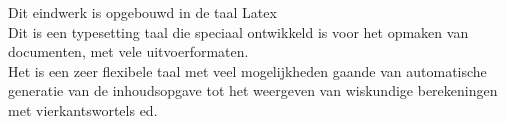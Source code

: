 Dit eindwerk is opgebouwd in de taal Latex\\
Dit is een typesetting taal die speciaal ontwikkeld is voor het opmaken van documenten,
met vele uitvoerformaten.\\
Het is een zeer flexibele taal met veel mogelijkheden gaande van automatische generatie van de inhoudsopgave tot het weergeven van wiskundige berekeningen met vierkantswortels ed.\\
